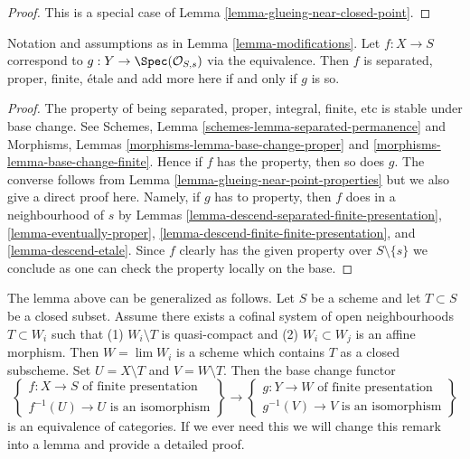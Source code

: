 \begin{proof}
This is a special case of Lemma \ref{lemma-glueing-near-closed-point}.
\end{proof}

\begin{lemma}
\label{lemma-modifications-properties}
Notation and assumptions as in Lemma \ref{lemma-modifications}.
Let $f : X \to S$ correspond to $g : Y \to \Spec(\mathcal{O}_{S, s})$
via the equivalence. Then $f$ is separated, proper, finite, \'etale
and add more here if and only if $g$ is so.
\end{lemma}

\begin{proof}
The property of being separated, proper, integral, finite, etc
is stable under base change. See
Schemes, Lemma \ref{schemes-lemma-separated-permanence}
and
Morphisms, Lemmas \ref{morphisms-lemma-base-change-proper} and
\ref{morphisms-lemma-base-change-finite}.
Hence if $f$ has the property, then so does $g$.
The converse follows from Lemma \ref{lemma-glueing-near-point-properties}
but we also give a direct proof here.
Namely, if $g$ has to property, then $f$ does in a neighbourhood of $s$ by
Lemmas \ref{lemma-descend-separated-finite-presentation},
\ref{lemma-eventually-proper},
\ref{lemma-descend-finite-finite-presentation}, and
\ref{lemma-descend-etale}.
Since $f$ clearly has the given property over $S \setminus \{s\}$
we conclude as one can check the property locally on the base.
\end{proof}

\begin{remark}
\label{remark-more-general-modification}
The lemma above can be generalized as follows. Let $S$ be a scheme and
let $T \subset S$ be a closed subset. Assume there exists a cofinal
system of open neighbourhoods $T \subset W_i$ such that
(1) $W_i \setminus T$ is quasi-compact and
(2) $W_i \subset W_j$ is an affine morphism.
Then $W = \lim W_i$ is a scheme which contains $T$
as a closed subscheme. Set $U = X \setminus T$ and $V = W \setminus T$.
Then the base change functor
$$
\left\{
\begin{matrix}
f : X \to S\text{ of finite presentation} \\
f^{-1}(U) \to U\text{ is an isomorphism}
\end{matrix}
\right\}
\longrightarrow
\left\{
\begin{matrix}
g : Y \to W\text{ of finite presentation} \\
g^{-1}(V) \to V\text{ is an isomorphism}
\end{matrix}
\right\}
$$
is an equivalence of categories. If we ever need this we will
change this remark into a lemma and provide a detailed proof.
\end{remark}



